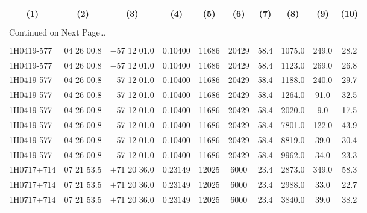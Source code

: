 \begin{landscape}
\begin{center}
\begin{longtable}{l c c c c c c c c c}
  \multicolumn{1}{c}{(1)} & 
  \multicolumn{1}{c}{(2)} &
  \multicolumn{1}{c}{(3)} &
  \multicolumn{1}{c}{(4)} &
  \multicolumn{1}{c}{(5)} &
  \multicolumn{1}{c}{(6)} &
  \multicolumn{1}{c}{(7)} &
  \multicolumn{1}{c}{(8)} &
  \multicolumn{1}{c}{(9)} &
  \multicolumn{1}{c}{(10)} \\[0.5ex] \hline \\[-1.8ex]
  \endhead

\multicolumn{10}{l}{{Continued on Next Page\ldots}} \\
\endfoot

\\[-1.8ex] \hline \hline
\endlastfoot
1H0419-577  &              04 26 00.8  &         $-$57 12 01.0  &       0.10400  & 11686  &   20429  &      58.4  &      1075.0  &  249.0  &  28.2  \\
1H0419-577  &              04 26 00.8  &         $-$57 12 01.0  &       0.10400  & 11686  &   20429  &      58.4  &      1123.0  &  269.0  &  26.8  \\
1H0419-577  &              04 26 00.8  &         $-$57 12 01.0  &       0.10400  & 11686  &   20429  &      58.4  &      1188.0  &  240.0  &  29.7  \\
1H0419-577  &              04 26 00.8  &         $-$57 12 01.0  &       0.10400  & 11686  &   20429  &      58.4  &      1264.0  &  91.0  &   32.5  \\
1H0419-577  &              04 26 00.8  &         $-$57 12 01.0  &       0.10400  & 11686  &   20429  &      58.4  &      2020.0  &  9.0  &    17.5  \\
1H0419-577  &              04 26 00.8  &         $-$57 12 01.0  &       0.10400  & 11686  &   20429  &      58.4  &      7801.0  &  122.0  &  43.9  \\
1H0419-577  &              04 26 00.8  &         $-$57 12 01.0  &       0.10400  & 11686  &   20429  &      58.4  &      8819.0  &  39.0  &   30.4  \\
1H0419-577  &              04 26 00.8  &         $-$57 12 01.0  &       0.10400  & 11686  &   20429  &      58.4  &      9962.0  &  34.0  &   23.3  \\
1H0717+714  &              07 21 53.5  &         $+$71 20 36.0  &       0.23149  & 12025  &   6000  &       23.4  &      2873.0  &  349.0  &  58.3  \\
1H0717+714  &              07 21 53.5  &         $+$71 20 36.0  &       0.23149  & 12025  &   6000  &       23.4  &      2988.0  &  33.0  &   22.7  \\
1H0717+714  &              07 21 53.5  &         $+$71 20 36.0  &       0.23149  & 12025  &   6000  &       23.4  &      3840.0  &  39.0  &   38.2  \\

\end{longtable}
\end{center}
\end{landscape}
